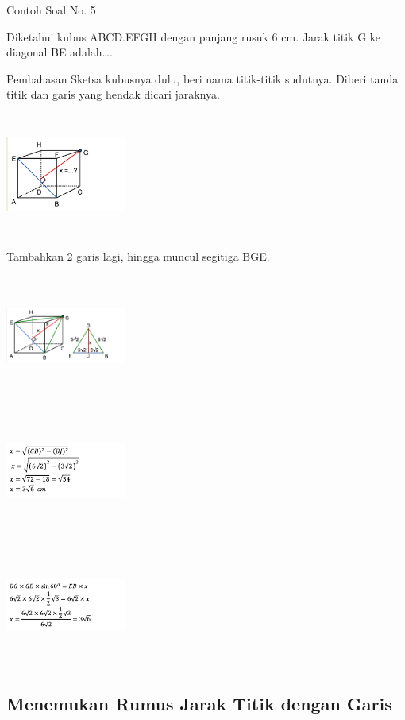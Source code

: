 \documentclass[11pt,fleqn]{book} %
\begin{document}
Contoh Soal No. 5

Diketahui kubus ABCD.EFGH dengan panjang rusuk 6 cm. Jarak titik G ke diagonal BE adalah….

Pembahasan
Sketsa kubusnya dulu, beri nama titik-titik sudutnya. Diberi tanda titik dan garis yang hendak dicari jaraknya. 

\includegraphics[width = 4cm, height= 4cm]{Pictures/gi25.png}

Tambahkan 2 garis lagi, hingga muncul segitiga BGE. 

\includegraphics[width = 4cm, height= 4cm]{Pictures/gi26.png}

\includegraphics[width = 4cm, height= 4cm]{Pictures/gi27.png}

\includegraphics[width = 4cm, height= 4cm]{Pictures/gi28.png}

\subsection{Menemukan Rumus Jarak Titik dengan Garis}
\end{document}
